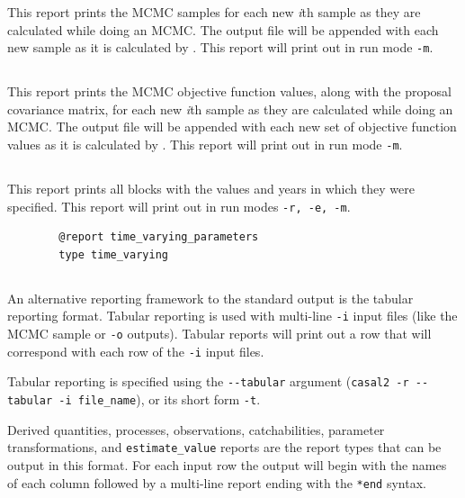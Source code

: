 This report prints the MCMC samples for each new \textit{i}th sample as they are calculated while doing an MCMC. The output file will be appended with each new sample as it is calculated by \CNAME. This report will print out in run mode \texttt{-m}.

\subsection{}\label{sec:Report-MCMCObjective}

This report prints the MCMC objective function values, along with the proposal covariance matrix, for each new \textit{i}th sample as they are calculated while doing an MCMC. The output file will be appended with each new set of objective function values as it is calculated by \CNAME. This report will print out in run mode \texttt{-m}.

\subsection{}\label{sec:Report-TimeVarying}

This report prints all  blocks with the values and years in which they were specified. This report will print out in run modes \texttt{-r, -e, -m}.

{\small{\begin{verbatim}
		@report time_varying_parameters
		type time_varying
		\end{verbatim}}}

\subsection{}\label{sec:Tabular}

An alternative reporting framework to the standard output is the tabular reporting format. Tabular reporting is used with multi-line \texttt{-i} input files (like the MCMC sample or \texttt{-o} outputs). Tabular reports will print out a row that will correspond with each row of the \texttt{-i} input files.

Tabular reporting is specified using the \texttt{-{}-tabular} argument (\texttt{casal2 -r -{}-tabular -i file\_name}), or its short form \texttt{-t}.

Derived quantities, processes, observations, catchabilities, parameter transformations, and \texttt{estimate\_value} reports are the report types that can be output in this format. For each input row the output will begin with the names of each column followed by a multi-line report ending with the \texttt{*end} syntax.

